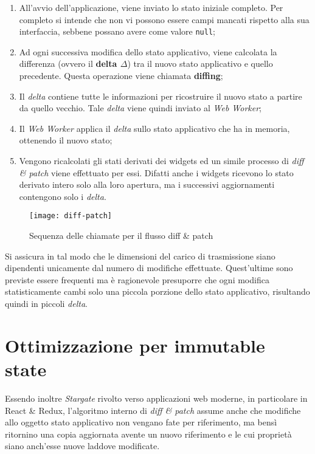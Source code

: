 \begin{enumerate}
  \item All'avvio dell'applicazione, viene inviato lo stato iniziale completo. Per completo si intende che non vi possono essere campi mancati rispetto alla sua interfaccia, sebbene possano avere come valore \texttt{null};
  \item Ad ogni successiva modifica dello stato applicativo, viene calcolata la differenza (ovvero il \textbf{delta $\Delta$}) tra il nuovo stato applicativo e quello precedente. Questa operazione viene chiamata \textbf{diffing};
  \item Il \textit{delta} contiene tutte le informazioni per ricostruire il nuovo stato a partire da quello vecchio. Tale \textit{delta} viene quindi inviato al \textit{Web Worker};
  \item Il \textit{Web Worker} applica il \textit{delta} sullo stato applicativo che ha in memoria, ottenendo il nuovo stato;
  \item Vengono ricalcolati gli stati derivati dei widgets ed un simile processo di \textit{diff \& patch} viene effettuato per essi. Difatti anche i widgets ricevono lo stato derivato intero solo alla loro apertura, ma i successivi aggiornamenti contengono solo i \textit{delta}.
\end{enumerate}

\begin{figure}[H] 
  \centering 
  \texttt{[image: diff-patch]} 
  \caption{Sequenza delle chiamate per il flusso diff \& patch}
\end{figure}

Si assicura in tal modo che le dimensioni del carico di trasmissione siano dipendenti unicamente dal numero di modifiche effettuate. Quest'ultime sono previste essere frequenti ma è ragionevole presuporre che ogni modifica statisticamente cambi solo una piccola porzione dello stato applicativo, risultando quindi in piccoli \textit{delta}. \\

\section{Ottimizzazione per immutable state}

Essendo inoltre \textit{Stargate} rivolto verso applicazioni web moderne, in particolare in React \& Redux, l'algoritmo interno di \textit{diff \& patch} assume anche che modifiche allo oggetto stato applicativo non vengano fate per riferimento, ma bensì ritornino una copia aggiornata avente un nuovo riferimento e le cui proprietà siano anch'esse nuove laddove modificate.

